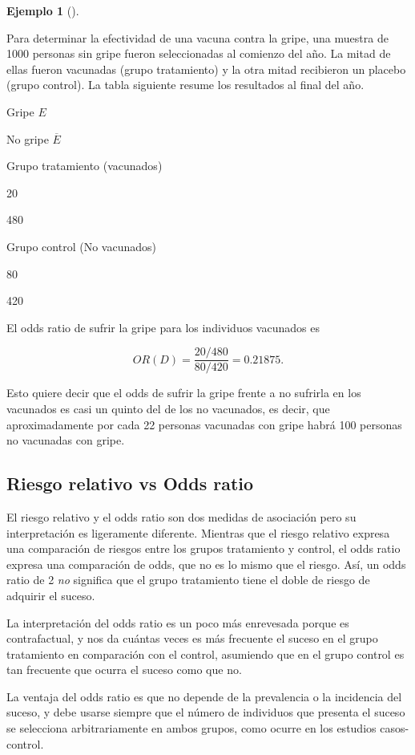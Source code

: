 \documentclass[
  a4paper,
]{scrreport}
\theoremstyle{plain}
\theoremstyle{definition}
\newtheorem{example}{Ejemplo}[chapter]
\theoremstyle{definition}
\theoremstyle{remark}
\begin{document}
\begin{example}[]\protect\hypertarget{exm-odds-ratio}{}\label{exm-odds-ratio}

Para determinar la efectividad de una vacuna contra la gripe, una
muestra de 1000 personas sin gripe fueron seleccionadas al comienzo del
año. La mitad de ellas fueron vacunadas (grupo tratamiento) y la otra
mitad recibieron un placebo (grupo control). La tabla siguiente resume
los resultados al final del año.

Gripe \(E\)

No gripe \(\overline E\)

Grupo tratamiento (vacunados)

20

480

Grupo control (No vacunados)

80

420

El odds ratio de sufrir la gripe para los individuos vacunados es

\[OR(D) = \frac{20/480}{80/420} = 0.21875.\]

Esto quiere decir que el odds de sufrir la gripe frente a no sufrirla en
los vacunados es casi un quinto del de los no vacunados, es decir, que
aproximadamente por cada 22 personas vacunadas con gripe habrá 100
personas no vacunadas con gripe.

\end{example}

\subsection{Riesgo relativo vs Odds
ratio}\label{riesgo-relativo-vs-odds-ratio}

El riesgo relativo y el odds ratio son dos medidas de asociación pero su
interpretación es ligeramente diferente. Mientras que el riesgo relativo
expresa una comparación de riesgos entre los grupos tratamiento y
control, el odds ratio expresa una comparación de odds, que no es lo
mismo que el riesgo. Así, un odds ratio de 2 \emph{no} significa que el
grupo tratamiento tiene el doble de riesgo de adquirir el suceso.

La interpretación del odds ratio es un poco más enrevesada porque es
contrafactual, y nos da cuántas veces es más frecuente el suceso en el
grupo tratamiento en comparación con el control, asumiendo que en el
grupo control es tan frecuente que ocurra el suceso como que no.

La ventaja del odds ratio es que no depende de la prevalencia o la
incidencia del suceso, y debe usarse siempre que el número de individuos
que presenta el suceso se selecciona arbitrariamente en ambos grupos,
como ocurre en los estudios casos-control.
\end{document}
